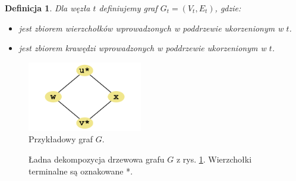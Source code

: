 \documentclass[12pt, oneside]{report}
\newtheorem{definition}{Definicja}
\begin{document}
\begin{definition}
\em Dla węzła $t$ definiujemy graf $G_t = (V_t, E_t)$, gdzie: 
\begin{itemize}[noitemsep,topsep=5pt,parsep=0pt,partopsep=0pt]
\item[$V_t$]{jest zbiorem wierzchołków wprowadzonych w poddrzewie ukorzenionym w $t$.}
\item[$E_t$]{jest zbiorem krawędzi wprowadzonych w poddrzewie ukorzenionym w $t$.} 
\end{itemize}
\end{definition}

\begin{figure}
\centering
\includegraphics[width=5cm]{square_steiner_tree_standard_graph.png}
\caption{Przykładowy graf $G$.}
\label{kwadrat}
\end{figure}

\begin{figure}
\centering
{}
\caption{Ładna dekompozycja drzewowa grafu $G$ z rys. \ref{kwadrat}. Wierzchołki terminalne są oznakowane *.}
\label{dekompozycja_kwadratu}
\end{figure}
\end{document}

